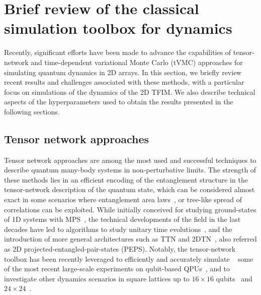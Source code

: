 \documentclass[aps,pra,reprint,amssymb,superscriptaddress]{revtex4-2}
\begin{document}
\section{\label{sec3} Brief review of the classical simulation toolbox for dynamics} 


Recently, significant efforts have been made to advance the capabilities of  tensor-network and time-dependent variational Monte Carlo (tVMC) approaches for simulating quantum dynamics in 2D arrays. 
In this section, we briefly review recent results and challenges associated with these methods, with a particular focus on simulations of the dynamics of the 2D TFIM. We also describe technical aspects of the hyperparameters used to obtain the results presented in the following sections.

\subsection{Tensor network approaches}

Tensor network approaches are among the most used and successful techniques to describe quantum many-body systems in non-perturbative limits. The strength of these methods lies in an efficient encoding of the entanglement structure in the tensor-network description of the quantum state, which can be considered almost exact in some scenarios where entanglement area laws~\cite{hastings_area_2007, eisert_colloquium_2010}, or tree-like spread of correlations can be exploited. While initially conceived for studying ground-states of 1D systems with MPS~\cite{white_density-matrix_1993, schollwock_density-matrix_2011}, the technical developments of the field in the last decades have led to algorithms to study unitary time evolutions~\cite{white_real-time_2004, secular_parallel_2020, paeckel_time-evolution_2019, haegeman_time-dependent_2011, vidal_efficient_2004, verstraete_matrix_2004}, and the introduction of more general architectures such as TTN and 2DTN~\cite{verstraete_renormalization_2004, jordan_classical_2008}, also referred as 2D projected-entangled-pair-states (PEPS). Notably, the tensor-network toolbox has been recently leveraged to efficiently and accurately simulate ~\cite{tindall_efficient_2024, tindall_confinement_2024, begusic_fast_2023,liao_simulation_2023} some of the most recent large-scale experiments on qubit-based QPUs~\cite{king_beyond-classical_2025, kim_evidence_2023}, and to investigate other dynamics scenarios in square lattices up to $16 \times 16$ qubits~\cite{pavesic_constrained_2025} and $24 \times 24$~\cite{pavesic_scattering_2025}.
\end{document}
